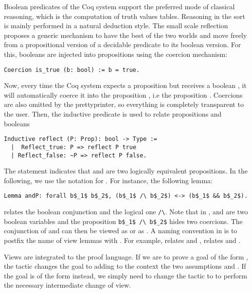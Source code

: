 Boolean predicates of the Coq system support the preferred mode of
classical reasoning, which is the computation of truth values
tables. Reasoning in the  sort is mainly performed in a
natural deduction style.
 The small scale reflection proposes 
a generic mechanism to have the best of the two worlds and move freely 
from a propositional version of a
decidable predicate to its boolean version.
For this, booleans are injected into propositions 
using the coercion mechanism:
\begin{lstlisting}
Coercion is_true (b: bool) := b = true.
\end{lstlisting}
Now, every time the {\sc Coq} system expects a proposition but receives a boolean , 
it will automatically coerce it into the proposition , i.e
the  proposition . Coercions are also omitted by the prettyprinter,
so everything is completely transparent to the user.
Then, the inductive predicate 
is used to relate propositions and booleans
\begin{lstlisting}
Inductive reflect (P: Prop): bool -> Type :=
  |  Reflect_true: P => reflect P true
  | Reflect_false: ~P => reflect P false.
\end{lstlisting}
The statement  indicates that 
and  are two logically equivalent propositions. In the following, we use
the notation  for .
For instance, the following lemma:
\begin{lstlisting}
Lemma andP: forall b$_1$ b$_2$, (b$_1$ /\ b$_2$) <-> (b$_1$ && b$_2$).
\end{lstlisting}
relates the boolean conjunction \C{\&\&} and
the logical one \lstinline[basicstyle=\footnotesize]+/\+. 
Note that in ,  and  are two boolean variables and
the proposition \lstinline[basicstyle=\footnotesize]+b$_1$ /\ b$_2$+ hides two coercions.
The conjunction of  and  can then be viewed
as   or as . 
A naming convention in \ssr{} is to postfix the name of view lemmas with .
For example,  relates  \C{\|\|} and \C{\\/},  relates   and \C{\~}.

Views are integrated to the proof language.
If we are to prove a goal of the form ,
the tactic  changes the goal to 
adding to the context the two assumptions
 and .
If the goal is of the form  instead, we simply need
to change the tactic to   to perform
the necessary intermediate change of view.

